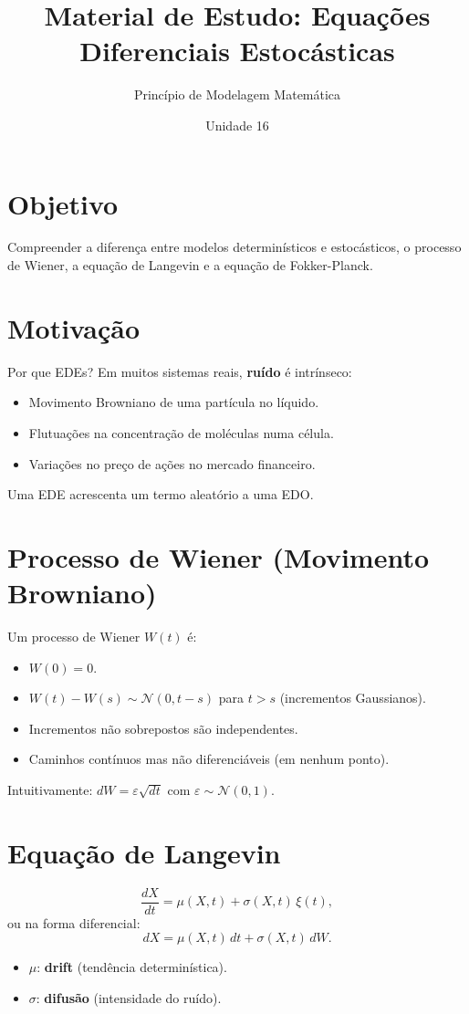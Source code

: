 \documentclass[12pt,a4paper]{article}
\title{Material de Estudo: Equa\c{c}\~oes Diferenciais Estoc\'asticas}
\author{Princ\'ipio de Modelagem Matem\'atica}
\date{Unidade 16}
\begin{document}
\maketitle

\section*{Objetivo}
Compreender a diferen\c{c}a entre modelos determin\'isticos e estoc\'asticos, o processo de Wiener, a equa\c{c}\~ao de Langevin e a equa\c{c}\~ao de Fokker-Planck.

\section*{Motivação}

Por que EDEs? Em muitos sistemas reais, \textbf{ru\'ido} \'e intr\'inseco:
\begin{itemize}
  \item Movimento Browniano de uma part\'icula no l\'iquido.
  \item Flutua\c{c}\~oes na concentra\c{c}\~ao de mol\'eculas numa c\'elula.
  \item Varia\c{c}\~oes no pre\c{c}o de a\c{c}\~oes no mercado financeiro.
\end{itemize}
Uma EDE acrescenta um termo aleat\'orio a uma EDO.

\section*{Processo de Wiener (Movimento Browniano)}

Um processo de Wiener $W(t)$ \'e:
\begin{itemize}
  \item $W(0) = 0$.
  \item $W(t) - W(s) \sim \mathcal{N}(0, t-s)$ para $t > s$ (incrementos Gaussianos).
  \item Incrementos n\~ao sobrepostos s\~ao independentes.
  \item Caminhos cont\'inuos mas n\~ao diferenci\'aveis (em nenhum ponto).
\end{itemize}
Intuitivamente: $dW = \varepsilon\sqrt{dt}$ com $\varepsilon \sim \mathcal{N}(0,1)$.

\section*{Equa\c{c}\~ao de Langevin}

\[
\frac{dX}{dt} = \mu(X,t) + \sigma(X,t)\,\xi(t),
\]
ou na forma diferencial:
\[
dX = \mu(X,t)\,dt + \sigma(X,t)\,dW.
\]
\begin{itemize}
  \item $\mu$: \textbf{drift} (tend\^encia determin\'istica).
  \item $\sigma$: \textbf{difus\~ao} (intensidade do ru\'ido).
\end{itemize}
\end{document}
